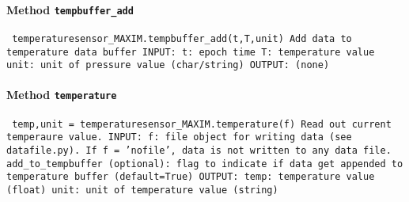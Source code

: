 \paragraph{Method \texttt{tempbuffer_add}}
\vspace{1ex}
\texttt{\newline
temperaturesensor_MAXIM.tempbuffer_add(t,T,unit)\newline
\newline
Add data to temperature data buffer\newline
\newline
INPUT:\newline
t: epoch time\newline
T: temperature value\newline
unit: unit of pressure value (char/string)\newline
\newline
OUTPUT:\newline
(none)\newline
\newline
}

\paragraph{Method \texttt{temperature}}
\vspace{1ex}
\texttt{\newline
temp,unit = temperaturesensor_MAXIM.temperature(f)\newline
\newline
Read out current temperaure value.\newline
\newline
INPUT:\newline
f: file object for writing data (see datafile.py). If f = 'nofile', data is not written to any data file.\newline
add_to_tempbuffer (optional): flag to indicate if data get appended to temperature buffer (default=True)\newline
\newline
OUTPUT:\newline
temp: temperature value (float)\newline
unit: unit of temperature value (string)\newline
\newline
}

